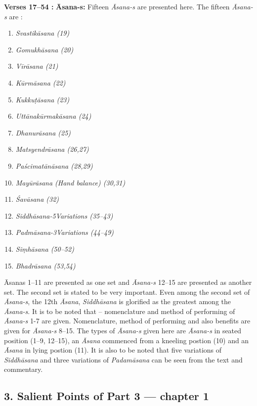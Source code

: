 \textbf{Verses  17--54 :} \textbf{Āsana-s:} Fifteen \textit{Āsana-s} are presented here. The fifteen \textit{Āsana-s} are :

\begin{multicols}{2}
\begin{enumerate}
\itemsep=0pt
\item \textit{Svastikāsana (19)}
\item \textit{Gomukhāsana (20)}
\item \textit{Vīrāsana  (21)}
\item \textit{Kūrmāsana (22)}
\item \textit{Kukkuṭāsana (23)}
\item \textit{Uttānakūrmakāsana (24)}
\item \textit{Dhanurāsana (25)}
\item \textit{Matsyendrāsana (26,27) }
\item \textit{Paścimatānāsana (28,29)}
\item \textit{Mayūrāsana (Hand balance) (30,31) }
\item \textit{Śavāsana (32)  	 		}
\item \textit{Siddhāsana-5\hfil\break Variations  (35--43) }
\item \textit{Padmāsana-3\hfil\break Variations (44--49)}
\item \textit{Siṃhāsana (50--52)   }
\item \textit{Bhadrāsana  (53,54)}
\end{enumerate}
\end{multicols}

Āsanas 1--11 are presented as one set and \textit{Āsana-s} 12--15 are presented as another set. The second set is stated to be very important. Even among the second set of \textit{Āsana-s}, the 12th \textit{Āsana}, \textit{Siddhāsana} is glorified as the greatest among the \textit{Āsana-s}. It is to be noted that – nomenclature and method of performing of \textit{Āsana-s} 1-7 are given. Nomenclature, method of performing and also benefits are given for \textit{Āsana-s} 8--15.  The types of \textit{Āsana-s} given here are \textit{Āsana-s} in seated position (1--9, 12--15), an \textit{Āsana}  commenced from a kneeling postion (10) and an \textit{Āsana} in lying postion (11). It is also to be noted that five variations of \textit{Siddhāsana} and three variations of \textit{Padamāsana} can be seen from the text and commentary.

\subsection*{3. Salient Points  of Part 3  --- chapter 1}

